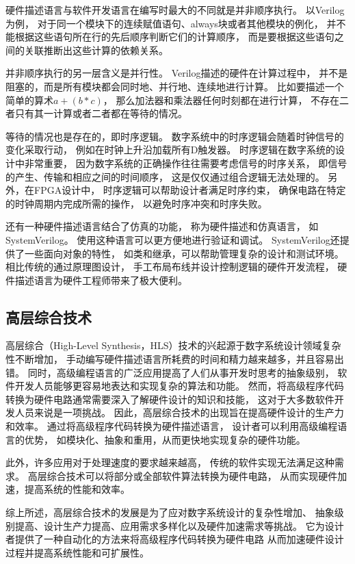 硬件描述语言与软件开发语言在编写时最大的不同就是并非顺序执行。
以Verilog为例，
对于同一个模块下的连续赋值语句、always块或者其他模块的例化，
并不能根据这些语句所在行的先后顺序判断它们的计算顺序，
而是要根据这些语句之间的关联推断出这些计算的依赖关系。

并非顺序执行的另一层含义是并行性。
Verilog描述的硬件在计算过程中，
并不是阻塞的，而是所有模块都会同时地、并行地、连续地进行计算。
比如要描述一个简单的算术$a + (b * c)$，
那么加法器和乘法器任何时刻都在进行计算，
不存在二者只有其一计算或者二者都在等待的情况。

等待的情况也是存在的，即时序逻辑。
数字系统中的时序逻辑会随着时钟信号的变化采取行动，
例如在时钟上升沿加载所有D触发器。
时序逻辑在数字系统的设计中非常重要，
因为数字系统的正确操作往往需要考虑信号的时序关系，
即信号的产生、传输和相应之间的时间顺序，
这是仅仅通过组合逻辑无法处理的。
另外，在FPGA设计中，
时序逻辑可以帮助设计者满足时序约束，
确保电路在特定的时钟周期内完成所需的操作，
以避免时序冲突和时序失败。

还有一种硬件描述语言结合了仿真的功能，
称为硬件描述和仿真语言，
如SystemVerilog。
使用这种语言可以更方便地进行验证和调试。
SystemVerilog还提供了一些面向对象的特性，
如类和继承，可以帮助管理复杂的设计和测试环境。
相比传统的通过原理图设计，
手工布局布线并设计控制逻辑的硬件开发流程，
硬件描述语言为硬件工程师带来了极大便利。

\subsection{高层综合技术}

高层综合（High-Level Synthesis，HLS）技术的兴起源于数字系统设计领域复杂性不断增加，
手动编写硬件描述语言所耗费的时间和精力越来越多，并且容易出错。
同时，高级编程语言的广泛应用提高了人们从事开发时思考的抽象级别，
软件开发人员能够更容易地表达和实现复杂的算法和功能。
然而，将高级程序代码转换为硬件电路通常需要深入了解硬件设计的知识和技能，
这对于大多数软件开发人员来说是一项挑战。
因此，高层综合技术的出现旨在提高硬件设计的生产力和效率。
通过将高级程序代码转换为硬件描述语言，
设计者可以利用高级编程语言的优势，
如模块化、抽象和重用，从而更快地实现复杂的硬件功能。

此外，许多应用对于处理速度的要求越来越高，
传统的软件实现无法满足这种需求。
高层综合技术可以将部分或全部软件算法转换为硬件电路，
从而实现硬件加速，提高系统的性能和效率。

综上所述，高层综合技术的发展是为了应对数字系统设计的复杂性增加、
抽象级别提高、设计生产力提高、应用需求多样化以及硬件加速需求等挑战。
它为设计者提供了一种自动化的方法来将高级程序代码转换为硬件电路
从而加速硬件设计过程并提高系统性能和可扩展性。

